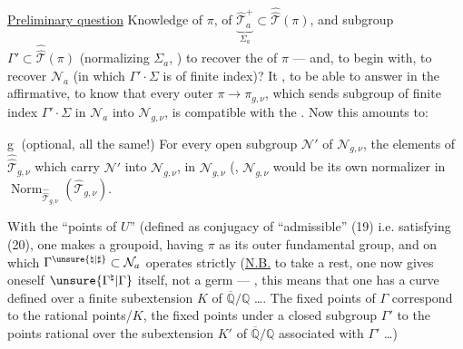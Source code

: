 \uline{Preliminary question} Knowledge of
$\pi$, of $\underbrace{\widehat{\mathcal T}_a^+}_{\Sigma_a}
\subset\widehat{\widehat{\mathcal T}}(\pi)$, and  subgroup
$\Gamma'\subset\widehat{\widehat{\mathcal T}}(\pi)$
(normalizing $\Sigma_a$, )
 to recover the  of $\pi$
--- and, to begin with, to recover
$\mathcal N_a$ (in which $\Gamma'\cdot\Sigma$ is of finite
index)?  It , to be able to
answer in the affirmative, to know
that every outer  $\pi\longrightarrow\pi_{g,\nu}$,
which sends 
 subgroup of finite
index $\Gamma'\cdot\Sigma$ in $\mathcal N_a$ into $\mathcal N_{g,\nu}$,
is compatible with the .
Now this amounts  to:

\textcircled{g} (optional, all the same!)
 For every open
subgroup $\mathcal N'$ of $\mathcal N_{g,\nu}$,
the elements of $\widehat{\widehat{\mathcal T}}_{g,\nu}$
which carry
$\mathcal N'$ into $\mathcal N_{g,\nu}$,  in $\mathcal N_{g,\nu}$
(,
$\mathcal N_{g,\nu}$ would be its own normalizer
in $\operatorname{Norm}_{\widehat{\widehat{\mathcal T}}_{g,\nu}}
(\widehat{\mathcal T}_{g,\nu})$.

With the ``points of $U$'' (defined as conjugacy 
of ``admissible''  (19)
i.e. satisfying (20), one
makes a groupoid, having
$\pi$ as its outer fundamental group, and on
which $\Gamma^{\unsure{\natural|\sharp}}\subset\mathcal N_a$ operates strictly
(\uline{N.B.} to take a rest, one now gives oneself
$\unsure{\Gamma^{\natural}|\Gamma}$ itself, not  a
germ --- , this means
that one has a curve defined over a
finite subextension $K$ of $\overline{\mathbb Q}/\mathbb Q$ \ldots\unsure{\}|)}.
The fixed points of $\Gamma$ correspond
to the rational points/$K$, the fixed points under a
closed subgroup $\Gamma'$ to the points rational
over the subextension $K'$ of $\overline{\mathbb Q}/\mathbb Q$ associated
with $\Gamma'$ \ldots)



